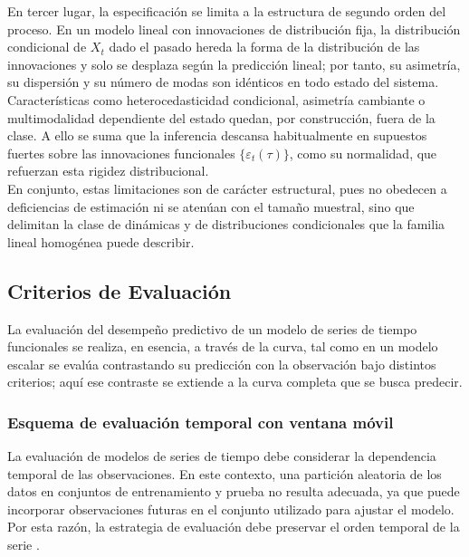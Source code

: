 En tercer lugar, la especificación se limita a la estructura de segundo orden del proceso. En un modelo lineal con innovaciones de distribución fija, la distribución condicional de $X_t$ dado el pasado hereda la forma de la distribución de las innovaciones y solo se desplaza según la predicción lineal; por tanto, su asimetría, su dispersión y su número de modas son idénticos en todo estado del sistema. Características como heterocedasticidad condicional, asimetría cambiante o multimodalidad dependiente del estado quedan, por construcción, fuera de la clase. A ello se suma que la inferencia descansa habitualmente en supuestos fuertes sobre las innovaciones funcionales $\{\varepsilon_t(\tau)\}$, como su normalidad, que refuerzan esta rigidez distribucional.\\

En conjunto, estas limitaciones son de carácter estructural, pues no obedecen a deficiencias de estimación ni se atenúan con el tamaño muestral, sino que delimitan la clase de dinámicas y de distribuciones condicionales que la familia lineal homogénea puede describir.

\subsection{Criterios de Evaluación}
\label{02_02_03_criterios_evaluacion}
La evaluación del desempeño predictivo de un modelo de series de tiempo funcionales se realiza, en esencia, a través de la curva, tal como en un modelo escalar se evalúa contrastando su predicción con la observación bajo distintos criterios; aquí ese contraste se extiende a la curva completa que se busca predecir.  

\subsubsection{Esquema de evaluación temporal con ventana móvil}
\label{02_02_03_01_esquema_evaluacion}

La evaluación de modelos de series de tiempo debe considerar la dependencia temporal de las observaciones. En este contexto, una partición aleatoria de los datos en conjuntos de entrenamiento y prueba no resulta adecuada, ya que puede incorporar observaciones futuras en el conjunto utilizado para ajustar el modelo. Por esta razón, la estrategia de evaluación debe preservar el orden temporal de la serie \citep{02_02_bergmeir2012crossvalidation}.\\

